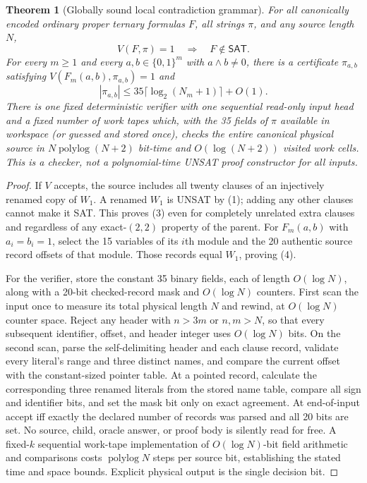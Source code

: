 \documentclass[11pt]{article}
\newtheorem{theorem}{Theorem}
\newcommand{\SAT}{\mathsf{SAT}}
\begin{document}
\begin{theorem}[Globally sound local contradiction grammar]\label{th:global}
For all canonically encoded ordinary proper ternary formulas $F$, all strings $\pi$, and any source length $N$,
\[
 V(F,\pi)=1\quad\Longrightarrow\quad F\notin\SAT.\tag{3}
\]
For every $m\ge1$ and every $a,b\in\{0,1\}^m$ with $a\wedge b\ne0$, there is a certificate $\pi_{a,b}$ satisfying $V(F_m(a,b),\pi_{a,b})=1$ and
\[
 |\pi_{a,b}|\le 35\lceil\log_2(N_m+1)\rceil+O(1).\tag{4}
\]
There is one fixed deterministic verifier with \emph{one sequential read-only input head} and a fixed number of work tapes which, with the 35 fields of $\pi$ available in workspace (or guessed and stored once), checks the entire canonical physical source in $N\operatorname{polylog}(N+2)$ bit-time and $O(\log(N+2))$ visited work cells. This is a checker, not a polynomial-time UNSAT proof constructor for all inputs.
\end{theorem}
\begin{proof}
If $V$ accepts, the source includes all twenty clauses of an injectively renamed copy of $W_1$. A renamed $W_1$ is UNSAT by (1); adding any other clauses cannot make it SAT. This proves (3) even for completely unrelated extra clauses and regardless of any exact-$(2,2)$ property of the parent. For $F_m(a,b)$ with $a_i=b_i=1$, select the 15 variables of its $i$th module and the 20 authentic source record offsets of that module. Those records equal $W_1$, proving (4).

For the verifier, store the constant 35 binary fields, each of length $O(\log N)$, along with a 20-bit checked-record mask and $O(\log N)$ counters. First scan the input once to measure its total physical length $N$ and rewind, at $O(\log N)$ counter space. Reject any header with $n>3m$ or $n,m>N$, so that every subsequent identifier, offset, and header integer uses $O(\log N)$ bits. On the second scan, parse the self-delimiting header and each clause record, validate every literal's range and three distinct names, and compare the current offset with the constant-sized pointer table. At a pointed record, calculate the corresponding three renamed literals from the stored name table, compare all sign and identifier bits, and set the mask bit only on exact agreement. At end-of-input accept iff exactly the declared number of records was parsed and all 20 bits are set. No source, child, oracle answer, or proof body is silently read for free. A fixed-$k$ sequential work-tape implementation of $O(\log N)$-bit field arithmetic and comparisons costs $\operatorname{polylog}N$ steps per source bit, establishing the stated time and space bounds. Explicit physical output is the single decision bit.\end{proof}
\end{document}

